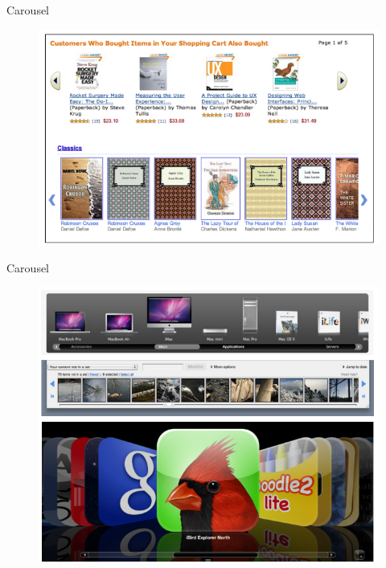 \documentclass{beamer}
\begin{document}
\begin{frame}[t]{Carousel}
	\begin{figure}[h]
		\centering
		\includegraphics[scale=0.5]{images/lec07-pic58.png}
	\end{figure}
\end{frame}	

\begin{frame}[t]{Carousel}
	\begin{figure}[h]
		\centering
		\includegraphics[scale=0.5]{images/lec07-pic59.png}
	\end{figure}
\end{frame}	
\end{document}
